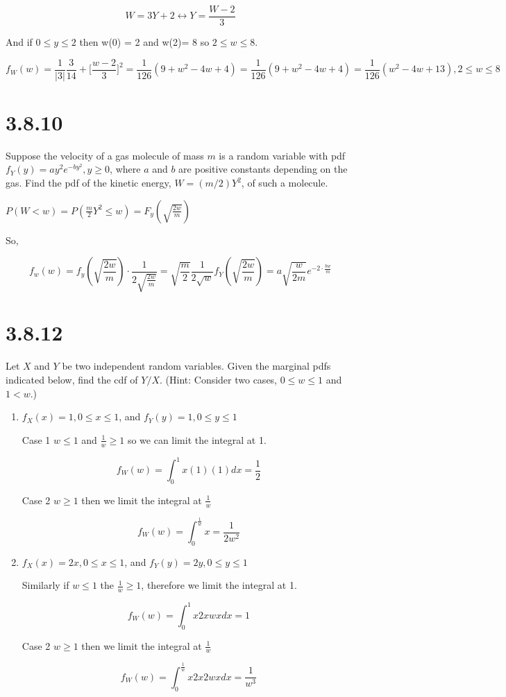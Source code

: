 \documentclass[svgnames]{article}
\begin{document}
 $$ W = 3Y+ 2 \leftrightarrow Y= \frac{W-2}{3}$$
 
 And if $0 \leq y \leq 2$ then w(0) = 2 and w(2)= 8 so $2\leq w \leq 8$. 

 $$ f_W(w)=\frac{1}{\left| 3 \right|}\frac{3}{14} + \Big[\frac{w-2}{3}\Big]^2= \frac{1}{126}(9+w^2-4w+4)= \frac{1}{126}(9+w^2-4w+4)= \frac{1}{126}(w^2-4w+13),  2 \leq w \leq 8$$

\section{3.8.10}
Suppose the velocity of a gas molecule of mass $m$ is a random variable with pdf $f_Y(y) = ay^2e^{-by^2}, y \geq 0$, where $a$ and $b$ are positive constants depending on the gas. Find the pdf of the kinetic energy, $W = (m/2)Y^2$, of such a molecule.

$P(W<w)= P(\frac{m}{2}Y^2\leq w)=F_y(\sqrt{\frac{2w}{m}})$

So,

$$f_w(w)=f_y(\sqrt{\frac{2w}{m}})\cdot\frac{1}{2\sqrt{\frac{2w}{m}}}=\sqrt{\frac{m}{2}}\frac{1}{2\sqrt{w}}f_Y(\sqrt{\frac{2w}{m}})=a\sqrt{\frac{w}{2m}} e^{-2\cdot \frac{bw}{m}}$$

\section{3.8.12}
Let $X$ and $Y$ be two independent random variables. Given the marginal pdfs indicated below, find the cdf of $Y/X$. (Hint: Consider two cases, $0 \leq w \leq 1$ and $1 < w$.) 

\begin{enumerate}[label=(\alph*)]
\item  $f_X(x) = 1, 0 \leq x \leq 1$, and $f_Y(y) = 1, 0 \leq y \leq 1 $

Case 1 $ w \leq 1$ and $\frac{1}{w}\geq1$ so we can limit the integral at 1.

$$f_W(w)=\int^{1}_{0}x(1)(1) dx= \frac{1}{2}$$

Case 2 $ w \geq 1$ then we limit the integral at $\frac{1}{w}$

$$ f_W(w) = \int_{0}^{\frac{1}{w}}x= \frac{1}{2w^2}$$

\item  $f_X(x) = 2x, 0 \leq x \leq 1$, and $f_Y(y) = 2y, 0 \leq y \leq 1 $

Similarly if $w\leq 1$ the $\frac{1}{w}\geq 1$, therefore we limit the integral at 1.

$$f_W(w) = \int^{1}_{0}x2xwx dx =1$$

Case 2 $ w \geq 1$ then we limit the integral at $\frac{1}{w}$

$$f_W(w) = \int_{0}^{\frac{1}{w}}x 2x 2wx dx =\frac{1}{w^3}$$

\end{enumerate}
\end{document}
